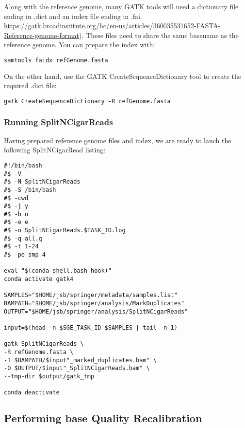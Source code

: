 Along with the reference genome, many GATK tools will need a dictionary file ending in .dict and an index file ending in .fai.\href{ https://gatk.broadinstitute.org/hc/en-us/articles/360035531652-FASTA-Reference-genome-format}{ https://gatk.broadinstitute.org/hc/en-us/articles/360035531652-FASTA-Reference-genome-format}). These files need to share the same basename as the reference genome. You can prepare the index with:

\begin{verbatim}
samtools faidx refGenome.fasta
\end{verbatim}

On the other hand, use the GATK CreateSequenceDictionary tool to create the required .dict file:

\begin{verbatim}
gatk CreateSequenceDictionary -R refGenome.fasta
\end{verbatim}




\subsubsection{Running SplitNCigarReads}

Having prepared reference genome files and index, we are ready to lauch the following SplitNCigarRead listing:

\begin{verbatim}
#!/bin/bash
#$ -V
#$ -N SplitNCigarReads
#$ -S /bin/bash
#$ -cwd
#$ -j y
#$ -b n
#$ -e e
#$ -o SplitNCigarReads.$TASK_ID.log
#$ -q all.q
#$ -t 1-24
#$ -pe smp 4
	
eval "$(conda shell.bash hook)"
conda activate gatk4
	
SAMPLES="$HOME/jsb/springer/metadata/samples.list"
BAMPATH="$HOME/jsb/springer/analysis/MarkDuplicates"
OUTPUT="$HOME/jsb/springer/analysis/SplitNCigarReads"
	
input=$(head -n $SGE_TASK_ID $SAMPLES | tail -n 1)

gatk SplitNCigarReads \
-R refGenome.fasta \
-I $BAMPATH/$input"_marked_duplicates.bam" \
-O $OUTPUT/$input"_SplitNCigarReads.bam" \
--tmp-dir $output/gatk_tmp
	
conda deactivate
\end{verbatim}



\subsection{Performing base Quality Recalibration}

